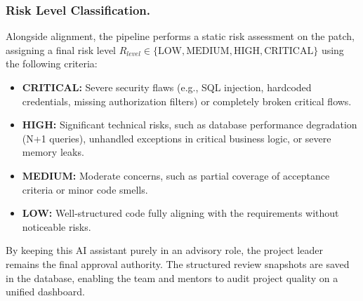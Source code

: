 \subsubsection{Risk Level Classification.}
Alongside alignment, the pipeline performs a static risk assessment on the patch, assigning a final risk level $R_{level} \in \{\text{LOW}, \text{MEDIUM}, \text{HIGH}, \text{CRITICAL}\}$ using the following criteria:
\begin{itemize}
    \item \textbf{CRITICAL:} Severe security flaws (e.g., SQL injection, hardcoded credentials, missing authorization filters) or completely broken critical flows.
    \item \textbf{HIGH:} Significant technical risks, such as database performance degradation (N+1 queries), unhandled exceptions in critical business logic, or severe memory leaks.
    \item \textbf{MEDIUM:} Moderate concerns, such as partial coverage of acceptance criteria or minor code smells.
    \item \textbf{LOW:} Well-structured code fully aligning with the requirements without noticeable risks.
\end{itemize}

By keeping this AI assistant purely in an advisory role, the project leader remains the final approval authority. The structured review snapshots are saved in the database, enabling the team and mentors to audit project quality on a unified dashboard.
